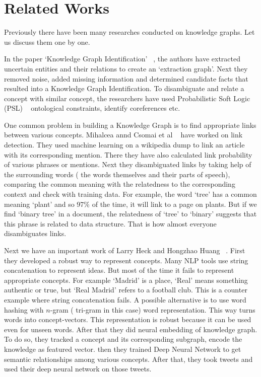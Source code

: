 \chapter{Related Works}\label{intro}
Previously there have been many researches conducted on knowledge graphs.
Let us discuss them one by one.
 
In the paper `Knowledge Graph Identification' ~\cite{ref0kgi}, the authors have extracted uncertain
 entities and their relations to create an `extraction graph'.  Next they removed noise, added missing 
 information and determined candidate facts that resulted into a Knowledge Graph Identification. To 
 disambiguate and relate a concept with similar concept,
the researchers have used Probabilistic Soft Logic (PSL) ~\cite{ref0psl}  ontological constraints,  
identify coreferences etc.

One common problem in building a Knowledge Graph is to find appropriate links between various 
concepts. Mihalcea annd Csomai et al ~\cite{ref3LinkWikipedia} have worked on link detection. They used 
machine learning on a wikipedia dump to link an article with its corresponding mention. 
There they have also calculated 
link probability of various phrases or mentions. Next they disambiguated links by taking help of the surrounding words 
( the words themselves and their parts of speech), comparing 
the  common meaning with the relatedness to the corresponding context and check with training data. 
For example, the word `tree' has a common meaning `plant' and so 97\% of the time, it will link to a page on plants.
But if we find `binary tree' in a document, the relatedness of `tree' to `binary' suggests that this
phrase is related to data structure. That is how almost everyone disambiguates links.   



 
Next we have an important work of Larry Heck and Hongzhao Huang ~\cite{ref1DeepLearning}. 
First they developed a robust way to represent concepts.
 Many NLP tools use string concatenation to represent ideas.
But most of the time it fails to represent appropriate concepts. For example `Madrid' is a place, `Real'
 means 
something authentic or true, but `Real Madrid' refers to a football club. 
This is a counter example where string concatenation fails.
A possible alternative is to use word hashing with $n$-gram ( tri-gram in this case) 
word representation. This way turns words into concept-vectors. This representation is 
robust because it can be used even for unseen words. After that they did neural embedding of knowledge graph. 
 To do so, they tracked a concept and its corresponding subgraph, encode the knowledge as featured vector.
 then they trained Deep Neural Network to get semantic relationships among various concepts.
After that, they took tweets and used their deep neural network on those tweets.
\endinput